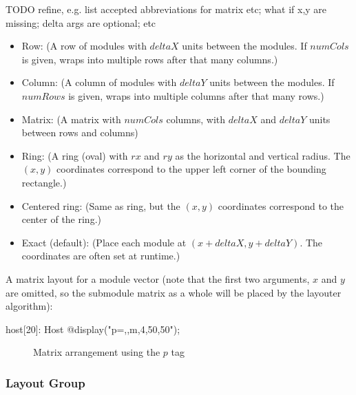TODO refine, e.g. list accepted abbreviations for matrix etc; what if x,y are missing; delta args are optional; etc

\begin{itemize}
  \item Row:  (A row of modules with $deltaX$ units between
            the modules. If $numCols$ is given, wraps into multiple rows after that many columns.)
  \item Column:  (A column of modules with $deltaY$ units
            between the modules. If $numRows$ is given, wraps into multiple columns after that many rows.)
  \item Matrix:  (A matrix with $numCols$ columns, with
            $deltaX$ and $deltaY$ units between rows and columns)
  \item Ring:  (A ring (oval) with $rx$ and $ry$ as the horizontal and vertical radius.
            The $(x,y)$ coordinates correspond to the upper left corner of the bounding rectangle.)
  \item Centered ring:  (Same as ring, but the $(x,y)$ coordinates
            correspond to the center of the ring.)
  \item Exact (default):  (Place each module at $(x+deltaX, y+deltaY)$.
            The coordinates are often set at runtime.)
\end{itemize}

A matrix layout for a module vector (note that the first two arguments, $x$
and $y$ are omitted, so the submodule matrix as a whole will be placed by
the layouter algorithm):

\begin{ned}
host[20]: Host {
    @display("p=,,m,4,50,50");
}
\end{ned}

\begin{figure}[htbp]
  \begin{center}
    \caption{Matrix arrangement using the $p$ tag}
    \label{fig:graphics-ptag}
  \end{center}
\end{figure}


\subsubsection{Layout Group}
\label{sec:graphics:submodule-layout-group}

